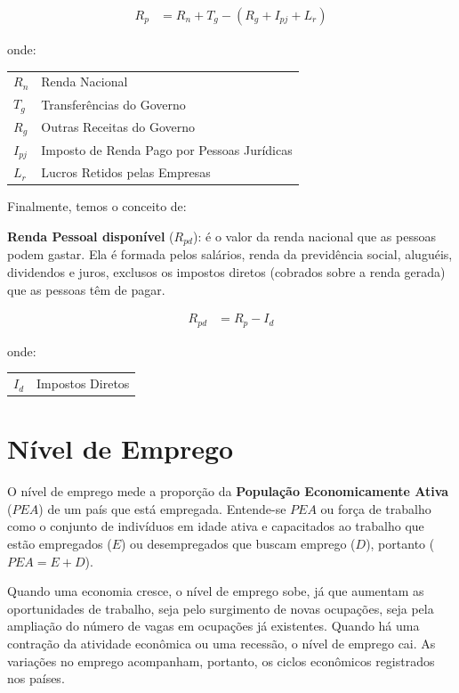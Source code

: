 \documentclass{article}\usepackage[]{graphicx}\usepackage[]{xcolor}
\makeatletter
\newenvironment{conditions}
  {\par\vspace{\abovedisplayskip}\noindent\begin{tabular}{>{$}l<{$} @{${}={}$} l}}
  {\end{tabular}\par\vspace{\belowdisplayskip}}
\makeatother
\begin{document}
\begin{equation}\label{eq6}
\begin{split}
    R_p   &=    R_n + T_g - (R_g + I_{pj} + L_r)
\end{split}
\end{equation}

onde:

\begin{conditions}
R_n   &   Renda Nacional\\
T_g   &   Transferências do Governo\\
R_g   &   Outras Receitas do Governo\\
I_{pj}&   Imposto de Renda Pago por Pessoas Jurídicas\\
L_r   &   Lucros Retidos pelas Empresas
\end{conditions}

Finalmente, temos o conceito de:\par

\textbf{Renda Pessoal disponível} (\(R_{pd}\)): é o valor da renda nacional que as pessoas podem gastar.
Ela é formada pelos salários, renda da previdência social, aluguéis, dividendos e juros,
exclusos os impostos diretos (cobrados sobre a renda gerada) que as pessoas têm de pagar.


\begin{equation}\label{eq7}
\begin{split}
    R_{pd}   &=    R_p - I_d
\end{split}
\end{equation}

onde:

\begin{conditions}
I_d   &   Impostos Diretos
\end{conditions}


\section*{Nível de Emprego}

O nível de emprego mede a proporção da \textbf{População Economicamente Ativa} (\(PEA\)) de um país que está empregada.
Entende-se \(PEA\) ou força de trabalho como o conjunto de indivíduos em idade ativa e capacitados ao trabalho
que estão empregados (\(E\)) ou desempregados que buscam emprego (\(D\)), portanto (\(PEA = E + D\)).\par

Quando uma economia cresce, o nível de emprego sobe, já que aumentam as oportunidades de trabalho, seja pelo
surgimento de novas ocupações, seja pela ampliação do número de vagas em ocupações já existentes.
Quando há uma contração da atividade econômica ou uma recessão, o nível de emprego cai. As variações no emprego
acompanham, portanto, os ciclos econômicos registrados nos países.\par
\end{document}
